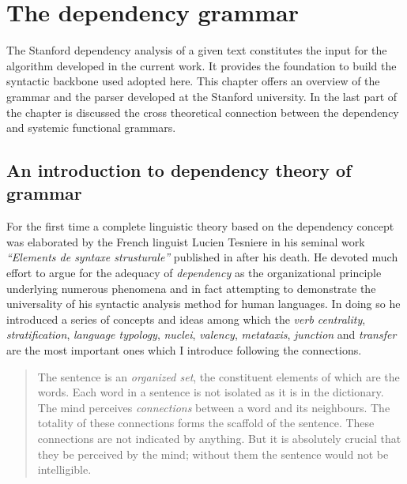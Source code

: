 \chapter{The dependency grammar}
\label{ch:dependecy-grappamr}

The Stanford dependency analysis of a given text constitutes the input for the algorithm developed in the current work. It provides the foundation to build the syntactic backbone used adopted here. This chapter offers an overview of the grammar and the parser developed at the Stanford university. In the last part of the chapter is discussed the cross theoretical connection between the dependency and systemic functional grammars. 

\section{An introduction to dependency theory of grammar}
For the first time a complete linguistic theory based on the dependency concept was elaborated by the French linguist Lucien Tesniere in his seminal work \textit{``Elements de syntaxe strusturale''} published in \citeyear{Tesniere59} after his death. He devoted much effort to argue for the adequacy of \textit{dependency} as the organizational principle underlying numerous phenomena and in fact attempting to demonstrate the universality of his syntactic analysis method for human languages. In doing so he introduced a series of concepts and ideas among which the \textit{verb centrality}, \textit{stratification}, \textit{language typology}, \textit{nuclei}, \textit{valency}, \textit{metataxis}, \textit{junction} and \textit{transfer} are the most important ones which I introduce following the connections.


\begin{quotation}
    The sentence is an \textit{organized set}, the constituent elements of which are the words. Each word in a sentence is not isolated as it is in the dictionary. The mind perceives \textit{connections} between a word and its neighbours. The totality of these connections forms the scaffold of the sentence. These connections are not indicated by anything. But it is absolutely crucial that they be perceived by the mind; without them the sentence would not be intelligible. \citep[3]{Tesniere2015}
\end{quotation}


